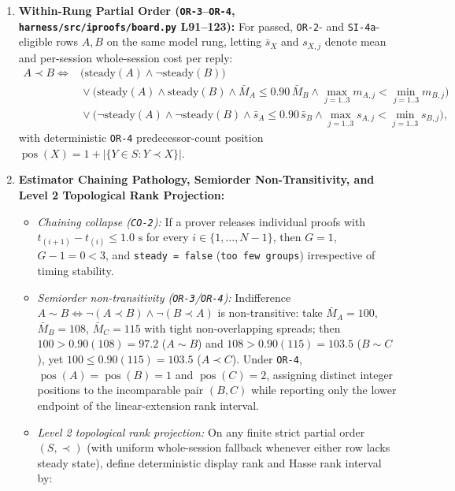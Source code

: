 \documentclass[11pt,letterpaper]{article}
\begin{document}
\begin{enumerate}
\[\]
\item \textbf{Within-Rung Partial Order (\texttt{OR-3}--\texttt{OR-4}, \texttt{harness/\allowbreak{}src/\allowbreak{}iproofs/\allowbreak{}board.\allowbreak{}py} L91--123):} For passed, \texttt{OR-2}- and \texttt{SI-4a}-eligible rows $A, B$ on the same model rung, letting $\bar{s}_X$ and $s_{X,j}$ denote mean and per-session whole-session cost per reply:
\begin{align*}
A \prec B \iff{} &\big(\text{steady}(A) \land \neg\text{steady}(B)\big) \\
&{}\lor \Big(\text{steady}(A) \land \text{steady}(B) \land \bar{M}_A \le 0.90\,\bar{M}_B \land \max_{j=1..3} m_{A,j} < \min_{j=1..3} m_{B,j}\Big) \\
&{}\lor \Big(\neg\text{steady}(A) \land \neg\text{steady}(B) \land \bar{s}_A \le 0.90\,\bar{s}_B \land \max_{j=1..3} s_{A,j} < \min_{j=1..3} s_{B,j}\Big),
\end{align*} with deterministic \texttt{OR-4} predecessor-count position $\operatorname{pos}(X) = 1 + |\{Y \in S : Y \prec X\}|$.
\item \textbf{Estimator Chaining Pathology, Semiorder Non-Transitivity, and Level 2 Topological Rank Projection:}
\begin{itemize}
\item \textit{Chaining collapse (\texttt{CO-2}):} If a prover releases individual proofs with $t_{(i+1)} - t_{(i)} \le 1.0\text{ s}$ for every $i \in \{1, \dots, N-1\}$, then $G = 1$, $G - 1 = 0 < 3$, and \texttt{steady = false} (\texttt{too few groups}) irrespective of timing stability.
\item \textit{Semiorder non-transitivity (\texttt{OR-3}/\texttt{OR-4}):} Indifference $A \sim B \iff \neg(A \prec B) \land \neg(B \prec A)$ is non-transitive: take $\bar{M}_A = 100$, $\bar{M}_B = 108$, $\bar{M}_C = 115$ with tight non-overlapping spreads; then $100 > 0.90(108) = 97.2$ ($A \sim B$) and $108 > 0.90(115) = 103.5$ ($B \sim C$), yet $100 \le 0.90(115) = 103.5$ ($A \prec C$). Under \texttt{OR-4}, $\operatorname{pos}(A) = \operatorname{pos}(B) = 1$ and $\operatorname{pos}(C) = 2$, assigning distinct integer positions to the incomparable pair $(B, C)$ while reporting only the lower endpoint of the linear-extension rank interval.
\item \textit{Level 2 topological rank projection:} On any finite strict partial order $(S, \prec)$ (with uniform whole-session fallback whenever either row lacks steady state), define deterministic display rank and Hasse rank interval by:
\begin{gather*}

\end{gather*}
\end{itemize}
\end{enumerate}
\end{document}
